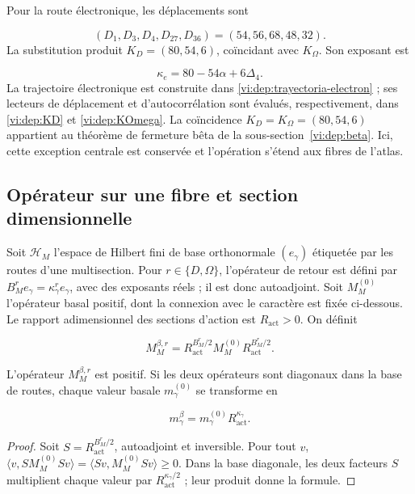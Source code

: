 Pour la route électronique, les déplacements sont

\[
 (D_1,D_3,D_4,D_{27},D_{36})=(54,56,68,48,32).
\]
La substitution produit \(K_D=(80,54,6)\), coïncidant avec
\(K_\Omega\). Son exposant est

\[
 \kappa_e=80-54\alpha+6\Delta_4.
\]
La trajectoire électronique est construite dans
\eqref{vi:dep:trayectoria-electron} ; ses lecteurs de déplacement et
d’autocorrélation sont évalués, respectivement, dans
\eqref{vi:dep:KD} et \eqref{vi:dep:KOmega}. La coïncidence
\(K_D=K_\Omega=(80,54,6)\) appartient au théorème de fermeture bêta de la
sous-section~\ref{vi:dep:beta}. Ici, cette exception centrale est conservée et
l’opération s’étend aux fibres de l’atlas.


\subsection{Opérateur sur une fibre et section dimensionnelle
}

Soit \(\mathscr H_M\) l’espace de Hilbert fini de base orthonormale
\((e_\gamma)\) étiquetée par les routes d’une multisection. Pour
\(r\in\{D,\Omega\}\), l’opérateur de retour est défini par
\(B_M^re_\gamma=\kappa_\gamma^re_\gamma\), avec des exposants réels ;
il est donc autoadjoint. Soit \(M_M^{(0)}\) l’opérateur basal positif,
dont la connexion avec le caractère est fixée ci-dessous.
Le rapport adimensionnel des
sections d’action est \(R_{\mathrm{act}}>0\). On définit

\[
 M_M^{\beta,r}=R_{\mathrm{act}}^{B_M^r/2}
 M_M^{(0)}R_{\mathrm{act}}^{B_M^r/2}.
\]

\begin{proposition}
L’opérateur \(M_M^{\beta,r}\) est positif. Si les deux opérateurs sont
diagonaux dans la base de routes, chaque valeur basale \(m_\gamma^{(0)}\)
se transforme en

\[
 m_\gamma^\beta=m_\gamma^{(0)}R_{\mathrm{act}}^{\kappa_\gamma}.
\]
\end{proposition}
\begin{proof}
Soit \(S=R_{\mathrm{act}}^{B_M^r/2}\), autoadjoint et inversible.
Pour tout \(v\),
\(\langle v,SM_M^{(0)}Sv\rangle=\langle Sv,M_M^{(0)}Sv\rangle\ge0\).
Dans la base diagonale, les deux facteurs \(S\) multiplient chaque valeur
par \(R_{\mathrm{act}}^{\kappa_\gamma/2}\) ; leur produit donne la formule.

\end{proof}

